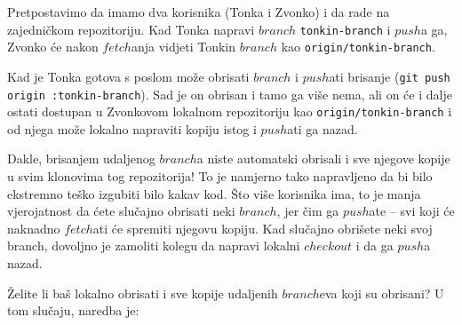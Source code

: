 
Pretpostavimo da imamo dva korisnika (Tonka i Zvonko) i da rade na zajedničkom repozitoriju.
Kad Tonka napravi $branch$ \verb+tonkin-branch+ i $push$a ga, Zvonko će nakon $fetch$anja vidjeti Tonkin $branch$ kao \verb+origin/tonkin-branch+.

Kad je Tonka gotova s poslom može obrisati $branch$ i $push$ati brisanje (\verb+git push origin :tonkin-branch+).
Sad je on obrisan i tamo ga više nema, ali on će i dalje ostati dostupan u Zvonkovom lokalnom repozitoriju kao \verb+origin/tonkin-branch+ i od njega može lokalno napraviti kopiju istog i $push$ati ga nazad.

Dakle, brisanjem udaljenog $branch$a niste automatski obrisali i sve njegove kopije u svim klonovima tog repozitorija!
To je namjerno tako napravljeno da bi bilo ekstremno teško izgubiti bilo kakav kod. 
Što više korisnika ima, to je manja vjerojatnost da ćete slučajno obrisati neki $branch$, jer čim ga $push$ate -- svi koji će naknadno $fetch$ati će spremiti njegovu kopiju.
Kad slučajno obrišete neki svoj branch, dovoljno je zamoliti kolegu da napravi lokalni $checkout$ i da ga $push$a nazad.

Želite li baš lokalno obrisati i sve kopije udaljenih $branch$eva koji su obrisani?
U tom slučaju, naredba je:

